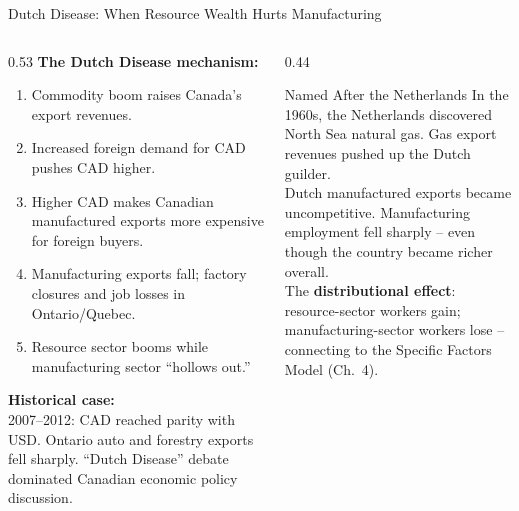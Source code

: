 \documentclass[aspectratio=169]{beamer}
\begin{document}
\begin{frame}[shrink=7]{Dutch Disease: When Resource Wealth Hurts Manufacturing}
\begin{columns}[T]
\begin{column}{0.53\textwidth}
\textbf{The Dutch Disease mechanism:}
\begin{enumerate}\small
  \item Commodity boom raises Canada's export revenues.
  \item Increased foreign demand for CAD pushes CAD higher.
  \item Higher CAD makes Canadian manufactured exports more expensive for foreign buyers.
  \item Manufacturing exports fall; factory closures and job losses in Ontario/Quebec.
  \item Resource sector booms while manufacturing sector ``hollows out.''
\end{enumerate}
\vspace{0.2em}
\textbf{Historical case:}\\
2007--2012: CAD reached parity with USD. Ontario auto and forestry exports fell sharply. ``Dutch Disease'' debate dominated Canadian economic policy discussion.
\end{column}
\begin{column}{0.44\textwidth}
\begin{insight}{Named After the Netherlands}
\footnotesize In the 1960s, the Netherlands discovered North Sea natural gas. Gas export revenues pushed up the Dutch guilder.\\[0.2em]
Dutch manufactured exports became uncompetitive. Manufacturing employment fell sharply -- even though the country became richer overall.\\[0.2em]
The \textbf{distributional effect}: resource-sector workers gain; manufacturing-sector workers lose -- connecting to the Specific Factors Model (Ch.~4).
\end{insight}
\end{column}
\end{columns}
\end{frame}
\end{document}
